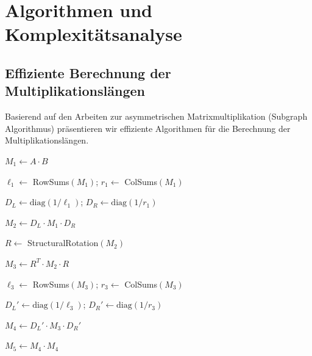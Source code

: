 \documentclass[a4paper,12pt]{article}
\theoremstyle{definition}
\begin{document}
\section{Algorithmen und Komplexitätsanalyse}

\subsection{Effiziente Berechnung der Multiplikationslängen}

Basierend auf den Arbeiten zur asymmetrischen Matrixmultiplikation (Subgraph Algorithmus) präsentieren wir effiziente Algorithmen für die Berechnung der Multiplikationslängen.

\begin{algorithm}
\caption{Berechnung der Multiplikationslängen (MLM-Algorithmus)}
\label{alg:mlm}
\begin{algorithmic}[1]

\State $M_1 \leftarrow A \cdot B$ 

\State $\ell_1 \leftarrow$ RowSums$(M_1)$; $r_1 \leftarrow$ ColSums$(M_1)$ 

\State $D_L \leftarrow \mathrm{diag}(1/\ell_1)$; $D_R \leftarrow \mathrm{diag}(1/r_1)$ 

\State $M_2 \leftarrow D_L \cdot M_1 \cdot D_R$ 

\State $R \leftarrow$ StructuralRotation$(M_2)$ 

\State $M_3 \leftarrow R^T \cdot M_2 \cdot R$ 

\State $\ell_3 \leftarrow$ RowSums$(M_3)$; $r_3 \leftarrow$ ColSums$(M_3)$ 

\State $D_L' \leftarrow \mathrm{diag}(1/\ell_3)$; $D_R' \leftarrow \mathrm{diag}(1/r_3)$

\State $M_4 \leftarrow D_L' \cdot M_3 \cdot D_R'$ 

\State $M_5 \leftarrow M_4 \cdot M_4$ 

\State {}
\end{algorithmic}
\end{algorithm}
\end{document}
